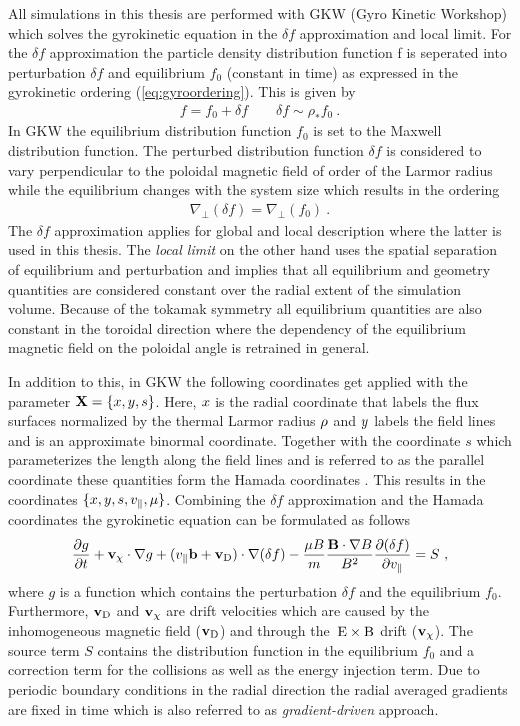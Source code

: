 All simulations in this thesis are performed with GKW (Gyro Kinetic Workshop) which solves the gyrokinetic equation in the $\delta f$ approximation and local limit. For the $\delta f$ approximation the particle density distribution function f is seperated into perturbation $\delta f$ and equilibrium $f_0$ (constant in time) as expressed in the gyrokinetic ordering (\ref{eq:gyroordering}). This is given by
\begin{gather}
	f = f_0 + \delta f \qquad \delta f \sim \rho_* f_0~.
\end{gather}
In GKW the equilibrium distribution function $f_0$ is set to the Maxwell distribution function. The perturbed distribution function $\delta f$ is considered to vary perpendicular to the poloidal magnetic field of order of the Larmor radius while the equilibrium changes with the system size which results in the ordering
\begin{gather}
	\nabla_\perp(\delta f) = \nabla_\perp (f_0)~.
\end{gather}
The $\delta f$ approximation applies for global and local description where the latter is used in this thesis.
The \textit{local limit} on the other hand uses the spatial separation of equilibrium and perturbation and implies that all equilibrium and geometry quantities are considered constant over the radial extent of the simulation volume. Because of the tokamak symmetry all equilibrium quantities are also constant in the toroidal direction where the dependency of the equilibrium magnetic field on the poloidal angle is retrained in general. \\\bigskip

In addition to this, in GKW the following coordinates get applied with the parameter $\boldsymbol{\mathbf{X}} = \{x, y, s\}$. Here, $x$ is the radial coordinate that labels the flux surfaces normalized by the thermal Larmor radius $\rho$ and $y$ labels the field lines and is an approximate binormal coordinate. Together with the coordinate $s$ which parameterizes the length along the field lines and is referred to as the parallel coordinate these quantities form the Hamada coordinates \cite{Hamada1958}. This results in the coordinates $\{x, y, s, v_\parallel, \mu\}$. Combining the $\delta f$ approximation and the Hamada coordinates the gyrokinetic equation can be formulated as follows
\begin{gather}
	\frac{\partial g}{\partial t} + \boldsymbol{\mathbf{v}}_\chi \cdot \nabla g + (v_\parallel \boldsymbol{\mathbf{b}} + \boldsymbol{\mathbf{v}}_\mathrm{D}) \cdot \nabla(\delta f) - \frac{\mu B}{m}\frac{\boldsymbol{\mathbf{B}}\cdot\nabla B}{B^2}\frac{\partial (\delta f)}{\partial v_\parallel} = S~,
\end{gather}
where $g$ is a function which contains the perturbation $\delta f$ and the equilibrium $f_0$. Furthermore, $\boldsymbol{\mathbf{v}}_\mathrm{D}$ and $\boldsymbol{\mathbf{v}}_\chi$ are drift velocities which are caused by the inhomogeneous magnetic field ($\boldsymbol{\mathbf{v}}_\mathrm{D}$) and through the $\mathrm{\:E}\times\mathrm{B}$ drift ($\boldsymbol{\mathbf{v}}_\chi$). The source term $S$ contains the distribution function in the equilibrium $f_0$ and a correction term for the collisions as well as the energy injection term. Due to periodic boundary conditions in the radial direction the radial averaged gradients are fixed in time which is also referred to as \textit{gradient-driven} approach. \cite{Peeters2009}